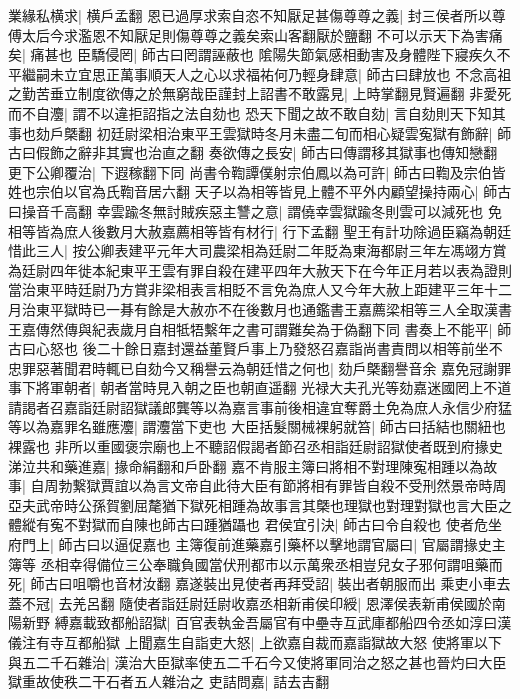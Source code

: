 業緣私横求|{
	横戶孟翻}
恩已過厚求索自恣不知厭足甚傷尊尊之義|{
	封三侯者所以尊傅太后今求濫恩不知厭足則傷尊尊之義矣索山客翻厭於鹽翻}
不可以示天下為害痛矣|{
	痛甚也}
臣驕侵罔|{
	師古曰罔謂誣蔽也}
隂陽失節氣感相動害及身體陛下寢疾久不平繼嗣未立宜思正萬事順天人之心以求福祐何乃輕身肆意|{
	師古曰肆放也}
不念高祖之勤苦垂立制度欲傳之於無窮哉臣謹封上詔書不敢露見|{
	上時掌翻見賢遍翻}
非愛死而不自灋|{
	謂不以違拒詔指之法自劾也}
恐天下聞之故不敢自劾|{
	言自劾則天下知其事也劾戶槩翻}
初廷尉梁相治東平王雲獄時冬月未盡二旬而相心疑雲寃獄有飾辭|{
	師古曰假飾之辭非其實也治直之翻}
奏欲傳之長安|{
	師古曰傳謂移其獄事也傳知戀翻}
更下公卿覆治|{
	下遐稼翻下同}
尚書令鞫譚僕射宗伯鳳以為可許|{
	師古曰鞫及宗伯皆姓也宗伯以官為氏鞫音居六翻}
天子以為相等皆見上體不平外内顧望操持兩心|{
	師古曰操音千高翻}
幸雲踰冬無討賊疾惡主讐之意|{
	謂僥幸雲獄踰冬則雲可以減死也}
免相等皆為庶人後數月大赦嘉薦相等皆有材行|{
	行下孟翻}
聖王有計功除過臣竊為朝廷惜此三人|{
	按公卿表建平元年大司農梁相為廷尉二年貶為東海都尉三年左馮翊方賞為廷尉四年徙本紀東平王雲有罪自殺在建平四年大赦天下在今年正月若以表為證則當治東平時廷尉乃方賞非梁相表言相貶不言免為庶人又今年大赦上距建平三年十二月治東平獄時已一朞有餘是大赦亦不在後數月也通鑑書王嘉薦梁相等三人全取漢書王嘉傳然傳與紀表歲月自相牴牾繫年之書可謂難矣為于偽翻下同}
書奏上不能平|{
	師古曰心怒也}
後二十餘日嘉封還益董賢戶事上乃發怒召嘉詣尚書責問以相等前坐不忠罪惡著聞君時輒已自劾今又稱譽云為朝廷惜之何也|{
	劾戶槩翻譽音余}
嘉免冠謝罪事下將軍朝者|{
	朝者當時見入朝之臣也朝直遥翻}
光禄大夫孔光等劾嘉迷國罔上不道請謁者召嘉詣廷尉詔獄議郎龔等以為嘉言事前後相違宜奪爵土免為庶人永信少府猛等以為嘉罪名雖應灋|{
	謂灋當下吏也}
大臣括髮關械裸躬就笞|{
	師古曰括結也關紐也裸露也}
非所以重國褒宗廟也上不聽詔假謁者節召丞相詣廷尉詔獄使者既到府掾史涕泣共和藥進嘉|{
	掾命絹翻和戶卧翻}
嘉不肯服主簿曰將相不對理陳寃相踵以為故事|{
	自周勃繋獄賈誼以為言文帝自此待大臣有節將相有罪皆自殺不受刑然景帝時周亞夫武帝時公孫賀劉屈氂猶下獄死相踵為故事言其槩也理獄也對理對獄也言大臣之體縱有寃不對獄而自陳也師古曰踵猶躡也}
君侯宜引決|{
	師古曰令自殺也}
使者危坐府門上|{
	師古曰以逼促嘉也}
主簿復前進藥嘉引藥杯以擊地謂官屬曰|{
	官屬謂掾史主簿等}
丞相幸得備位三公奉職負國當伏刑都市以示萬衆丞相豈兒女子邪何謂咀藥而死|{
	師古曰咀嚼也音材汝翻}
嘉遂裝出見使者再拜受詔|{
	裝出者朝服而出}
乘吏小車去蓋不冠|{
	去羌呂翻}
隨使者詣廷尉廷尉收嘉丞相新甫侯印綬|{
	恩澤侯表新甫侯國於南陽新野}
縛嘉載致都船詔獄|{
	百官表執金吾屬官有中壘寺互武庫都船四令丞如淳曰漢儀注有寺互都船獄}
上聞嘉生自詣吏大怒|{
	上欲嘉自裁而嘉詣獄故大怒}
使將軍以下與五二千石雜治|{
	漢治大臣獄率使五二千石今又使將軍同治之怒之甚也晉灼曰大臣獄重故使秩二干石者五人雜治之}
吏詰問嘉|{
	詰去吉翻}
